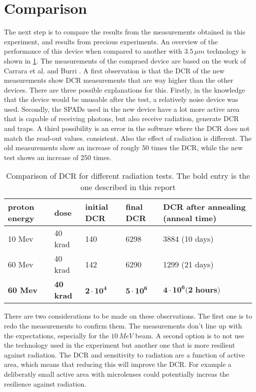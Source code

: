 \clearpage
\section{Comparison}\label{ssec:results}

The next step is to compare the results from the measurements obtained in this experiment, and results from precious experiments. An overview of the performance of this device when compared to another with $3.5\,\mu m$ technology is shown in \cref{tab:comparison}. The measurements of the compraed device are based on the work of Carrara et al. \cite{carrara2009gamma} and Burri \cite{burri2016thesis}. A first observation is that the DCR of the new measurements show DCR measurements that are way higher than the other devices. There are three possible explanations for this. Firstly, in the knowledge that the device would be unusable after the test, a relatively noise device was used. Secondly, the SPADs used in the new device have a lot more active area that is capable of receiving photons, but also receive radiation, generate DCR and traps. A third possibility is an error in the software where the DCR does not match the read-out values. consistent. Also the effect of radiation is different. The old measurements show an increase of rougly 50 times the DCR, while the new test shows an increase of 250 times.

\begin{table}[h]
		\centering
\caption{Comparison of DCR for different radiation tests. The bold entry is the one described in this report}
\label{tab:comparison}
\begin{tabular}{|ll|lll|} \hline
\textbf{proton energy} & dose             & initial DCR       & final DCR         & DCR after annealing (anneal time) \\ \hline
10 Mev                 & 40 krad          & 140               & 6298              & 3884 (10 days)                    \\
60 Mev                 & 40 krad          & 142               & 6290              & 1299 (21 days)                    \\
\textbf{60 Mev}        & \textbf{40 krad} & $\mathbf{2\cdot10^4}$ & $\mathbf{5\cdot10^6}$ & $\mathbf{4\cdot10^6 \textbf{(2 hours)}}$      \\  \hline
\end{tabular}
\end{table}

There are two considerations to be made on these observations. The first one is to redo the measurements to confirm them. The measurements don't line up with the expectations, especially for the $10\,MeV$ beam. A second option is to not use the technology used in the experiment but another one that is more resilient against radiation. The DCR and sensitivity to radiation are a function of active area, which means that reducing this will improve the DCR. For example a deliberatly small active area with microlenses could potentially increas the resilience against radiation.
